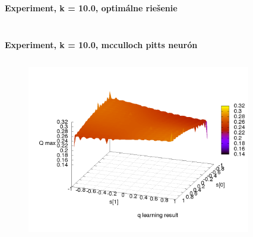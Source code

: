 \documentclass[xcolor=dvipsnames]{beamer}
\begin{document}
\begin{frame}{\bf Experiment, k = 10.0, optimálne riešenie}
\begin{columns}
\begin{column}{0.5\textwidth}
\begin{figure}[ht]
        \end{figure}

	\end{column}
\end{columns}

\end{frame}


\begin{frame}{\bf Experiment, k = 10.0, mcculloch pitts neurón}

\begin{columns}
	\begin{column}{0.5\textwidth}

        \begin{figure}[ht]

        \begin{center}
        \includegraphics[width=1.0\textwidth]{experiment_03/mcculloch_pitts_neuron/q_map.png}
        \end{center}

        \end{figure}

	\end{column}
	\begin{column}{0.5\textwidth}

        \begin{figure}[ht]


\end{figure}
\end{column}
\end{columns}
\end{frame}
\end{document}
